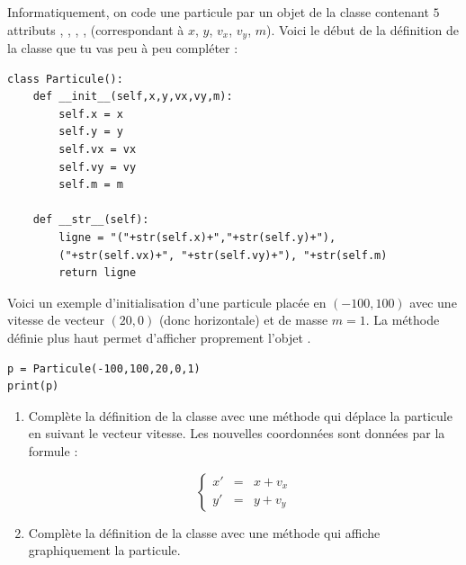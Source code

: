 \documentclass[11pt,class=report,crop=false]{standalone}
\begin{document}
\begin{activite}



Informatiquement, on code une particule par un objet de la classe  contenant $5$ attributs , , , ,  (correspondant à $x$, $y$, $v_x$, $v_y$, $m$). Voici le début de la définition de la classe  que tu vas peu à peu compléter :

\begin{lstlisting}
class Particule():
    def __init__(self,x,y,vx,vy,m):
        self.x = x
        self.y = y
        self.vx = vx
        self.vy = vy
        self.m = m

    def __str__(self):
        ligne = "("+str(self.x)+","+str(self.y)+"),
        ("+str(self.vx)+", "+str(self.vy)+"), "+str(self.m)
        return ligne 
\end{lstlisting}

Voici un exemple d'initialisation d'une particule  placée en $(-100,100)$ avec une vitesse de vecteur $(20,0)$ (donc horizontale) et de masse $m=1$. La méthode  définie plus haut permet d'afficher proprement l'objet .
\begin{lstlisting}
p = Particule(-100,100,20,0,1)
print(p)
\end{lstlisting}

\begin{enumerate}
  \item Complète la définition de la classe avec une méthode  qui déplace la particule en suivant le vecteur vitesse. Les nouvelles coordonnées sont données par la formule :
  
\begin{minipage}{0.4\textwidth}
  $$\left\lbrace\begin{array}{rcl}x' &=& x+ v_x\\y'&=&y+v_y\end{array}\right.$$
\end{minipage}
\begin{minipage}{0.49\textwidth}  
\end{minipage}

  \item Complète la définition de la classe avec une méthode  qui affiche
  graphiquement la particule.
  

\end{enumerate}
\end{activite}
\end{document}
